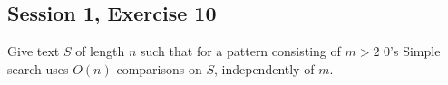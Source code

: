 \subsection{Session 1, Exercise 10}


Give text $S$ of length $n$ such that for a pattern consisting of $m>2$ $0$'s Simple search uses $O(n)$ comparisons on $S$, independently of $m$.

